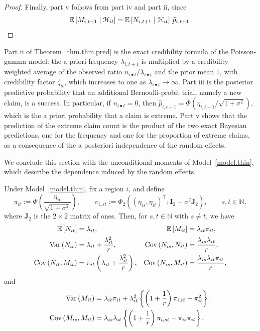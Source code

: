 \begin{proof}
Finally, part v follows from part iv and part ii, since
\[
{\mathbb E}\left[M_{i,t+1}\mid\mathcal H_{it}\right]
=
{\mathbb E}\left[N_{i,t+1}\mid\mathcal H_{it}\right]\,\widehat p_{i,t+1}.
\]
\end{proof}

\begin{remark}
\label{rem.thin.interpretation}
Part ii of Theorem~\ref{thm.thin.pred} is the exact credibility formula
of the Poisson-gamma model: the a priori frequency \(\lambda_{i,t+1}\)
is multiplied by a credibility-weighted average of the observed ratio
\(n_{i\bullet t}/\lambda_{i\bullet t}\) and the prior mean \(1\), with
credibility factor \(\zeta_{it}\), which increases to one as
\(\lambda_{i\bullet t}\to\infty\). Part iii is the posterior predictive
probability that an additional Bernoulli-probit trial, namely a new
claim, is a success.
In particular, if \(n_{i\bullet t}=0\), then
\(
\widehat p_{i,t+1}
=
\Phi\left(\eta_{i,t+1}/\sqrt{1+\sigma^2}\right),
\)
which is the a priori probability that a claim is extreme. Part v shows
that the prediction of the extreme claim count is the product of the
two exact Bayesian predictions, one for the frequency and one for the
proportion of extreme claims, as a consequence of the a posteriori
independence of the random effects.
\end{remark}

We conclude this section with the unconditional moments of
Model~\ref{model.thin}, which describe the dependence induced by the
random effects.

\begin{proposition}[Moments]
\label{prop.thin.moments}
Under Model~\ref{model.thin}, fix a region \(i\), and define
\[
\pi_{it}:=\Phi\left(\frac{\eta_{it}}{\sqrt{1+\sigma^2}}\right),
\qquad
\pi_{i,st}:=
\Phi_2\left(
(\eta_{is},\eta_{it})^\top;
\boldsymbol I_2+\sigma^2\boldsymbol J_2
\right),
\qquad s,t\in\mathbb N,
\]
where \(\boldsymbol J_2\) is the \(2\times2\) matrix of ones. Then, for
\(s,t\in\mathbb N\) with \(s\neq t\), we have
\[
\begin{aligned}
{\mathbb E}\left[N_{it}\right]&=\lambda_{it},
&
{\mathbb E}\left[M_{it}\right]&=\lambda_{it}\pi_{it},\\
{\rm Var}\left(N_{it}\right)&=\lambda_{it}+\frac{\lambda_{it}^2}{r},
&
{\rm Cov}\left(N_{is},N_{it}\right)&=\frac{\lambda_{is}\lambda_{it}}{r},\\
{\rm Cov}\left(N_{it},M_{it}\right)&=\pi_{it}\left(\lambda_{it}+\frac{\lambda_{it}^2}{r}\right),
&
{\rm Cov}\left(N_{is},M_{it}\right)&=\frac{\lambda_{is}\lambda_{it}\pi_{it}}{r},
\end{aligned}
\]
and
\[
\begin{aligned}
{\rm Var}\left(M_{it}\right)
&=
\lambda_{it}\pi_{it}
+
\lambda_{it}^2
\left\{
\left(1+\frac1r\right)\pi_{i,tt}-\pi_{it}^2
\right\},\\
{\rm Cov}\left(M_{is},M_{it}\right)
&=
\lambda_{is}\lambda_{it}
\left\{
\left(1+\frac1r\right)\pi_{i,st}-\pi_{is}\pi_{it}
\right\}.
\end{aligned}
\]
\end{proposition}

